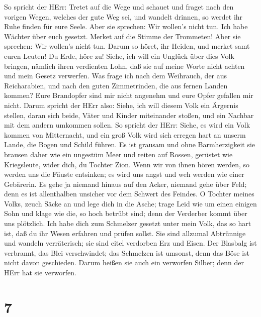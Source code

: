 So spricht der HErr: Tretet auf die Wege und schauet und fraget nach den
vorigen Wegen, welches der gute Weg sei, und wandelt drinnen, so werdet
ihr Ruhe finden für eure Seele. Aber sie sprechen: Wir wollen's nicht
tun.  Ich habe Wächter über euch gesetzt. Merket auf die
Stimme der Trommeten! Aber sie sprechen: Wir wollen's nicht tun.
 Darum so höret, ihr Heiden, und merket samt euren Leuten!
 Du Erde, höre zu! Siehe, ich will ein Unglück über dies
Volk bringen, nämlich ihren verdienten Lohn, daß sie auf meine Worte
nicht achten und mein Gesetz verwerfen.  Was frage ich nach
dem Weihrauch, der aus Reicharabien, und nach den guten Zimmetrinden,
die aus fernen Landen kommen? Eure Brandopfer sind mir nicht angenehm
und eure Opfer gefallen mir nicht.  Darum spricht der HErr
also: Siehe, ich will diesem Volk ein Ärgernis stellen, daran sich
beide, Väter und Kinder miteinander stoßen, und ein Nachbar mit dem
andern umkommen sollen.  So spricht der HErr: Siehe, es
wird ein Volk kommen von Mitternacht, und ein groß Volk wird sich
erregen hart an unserm Lande,  die Bogen und Schild führen.
Es ist grausam und ohne Barmherzigkeit sie brausen daher wie ein
ungestüm Meer und reiten auf Rossen, gerüstet wie Kriegsleute, wider
dich, du Tochter Zion.  Wenn wir von ihnen hören werden, so
werden uns die Fäuste entsinken; es wird uns angst und weh werden wie
einer Gebärerin.  Es gehe ja niemand hinaus auf den Acker,
niemand gehe über Feld; denn es ist allenthalben unsicher vor dem
Schwert des Feindes.  O Tochter meines Volks, zeuch Säcke
an und lege dich in die Asche; trage Leid wie um einen einigen Sohn und
klage wie die, so hoch betrübt sind; denn der Verderber kommt über uns
plötzlich.  Ich habe dich zum Schmelzer gesetzt unter mein
Volk, das so hart ist, daß du ihr Wesen erfahren und prüfen sollst.
 Sie sind allzumal Abtrünnige und wandeln verräterisch; sie
sind eitel verdorben Erz und Eisen.  Der Blasbalg ist
verbrannt, das Blei verschwindet; das Schmelzen ist umsonst, denn das
Böse ist nicht davon geschieden.  Darum heißen sie auch ein
verworfen Silber; denn der HErr hat sie verworfen.

\hypertarget{section-6}{%
\section{7}\label{section-6}}

